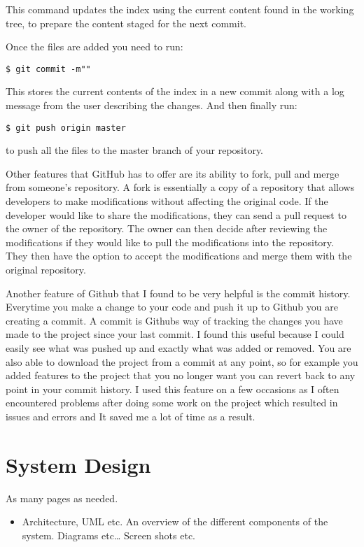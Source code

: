 This command updates the index using the current content found in the working tree, to prepare the content staged for the next commit. 

Once the files are added you need to run:

\begin{verbatim}
$ git commit -m""
\end{verbatim}
This stores the current contents of the index in a new commit along with a log message from the user describing the changes. And then finally run:
\begin{verbatim}
$ git push origin master
\end{verbatim}
to push all the files to the master branch of your repository.

Other features that GitHub has to offer are its ability to fork, pull and merge from someone's repository. A fork is essentially a copy of a repository that allows developers to make modifications without affecting the original code.  If the developer would like to share the modifications, they can send a pull request to the owner of the repository. The owner can then decide after reviewing the modifications if they would like to pull the modifications into the repository. They then have the option to accept the modifications and merge them with the original repository.\cite{githubop}

Another feature of Github that I found to be very helpful is the commit history. Everytime you make a change to your code and push it up to Github you are creating a commit. A commit is Githubs way of tracking the changes you have made to the project since your last commit. I found this useful because I could easily see what was pushed up and exactly what was added or removed. You are also able to download the project from a commit at any point, so for example you added features to the project that you no longer want you can revert back to any point in your commit history. I used this feature on a few occasions as I often encountered problems after doing some work on the project which resulted in issues and errors and It saved me a lot of time as a result.


\chapter{System Design}
As many pages as needed.
\begin{itemize}
\item Architecture, UML etc. An overview of the different components of the system. Diagrams etc… Screen shots etc.
\end{itemize}

